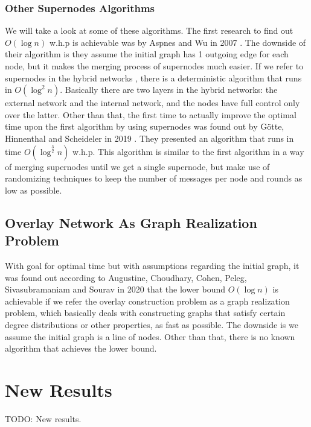 \documentclass[11pt]{article}
\begin{document}
\subsubsection{Other Supernodes Algorithms}
We will take a look at some of these algorithms. The first research to find out $O(\log{n})$ w.h.p is achievable was by Aspnes and Wu in 2007 \cite{ref3}. The downside of their algorithm is they assume the initial graph has 1 outgoing edge for each node, but it makes the merging process of supernodes much easier. If we refer to supernodes in the hybrid networks \cite{ref5}, there is a deterministic algorithm that runs in $O(\log^2{n})$. Basically there are two layers in the hybrid networks: the external network and the internal network, and the nodes have full control only over the latter. Other than that, the first time to actually improve the optimal time upon the first algorithm by using supernodes was found out by Götte, Hinnenthal and Scheideler in 2019 \cite{ref1}. They presented an algorithm that runs in time $O(\log^{\frac{3}{2}}n)$ w.h.p. This algorithm is similar to the first algorithm in a way of merging supernodes until we get a single supernode, but make use of randomizing techniques to keep the number of messages per node and rounds as low as possible.

\subsection{Overlay Network As Graph Realization Problem}
With goal for optimal time but with assumptions regarding the initial graph, it was found out according to Augustine, Choudhary, Cohen, Peleg, Sivasubramaniam and Sourav in 2020 \cite{ref4} that the lower bound $O(\log{n})$ is achievable if we refer the overlay construction problem as a graph realization problem, which basically deals with constructing graphs that satisfy certain degree distributions or other properties, as fast as possible. The downside is we assume the initial graph is a line of nodes. Other than that, there is no known algorithm that achieves the lower bound.

\section{New Results}
TODO: New results.



\end{document}

